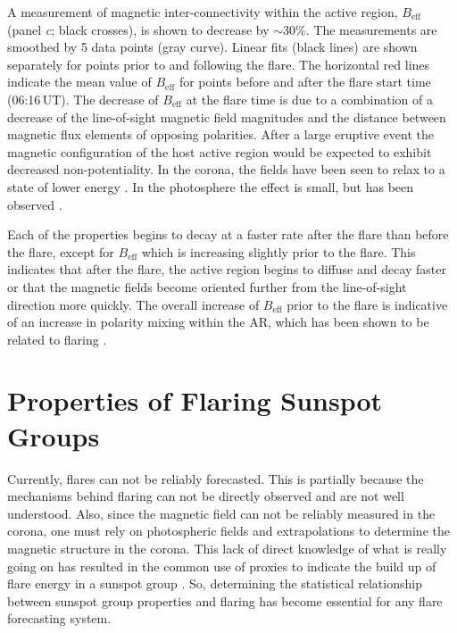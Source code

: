 A measurement of magnetic inter-connectivity within the active region, $B_{\mathrm{eff}}$ (panel \emph{c}; black crosses), is shown to decrease by $\sim$30\%. The measurements are smoothed by 5 data points (gray curve). Linear fits (black lines) are shown separately for points prior to and following the flare. The horizontal red lines indicate the mean value of  $B_{\mathrm{eff}}$ for points before and after the flare start time (06:16\,UT). The decrease of $B_{\mathrm{eff}}$ at the flare time is due to a combination of a decrease of the line-of-sight magnetic field magnitudes and the distance between magnetic flux elements of opposing polarities. After a large eruptive event the magnetic configuration of the host active region would be expected to exhibit decreased non-potentiality. In the corona, the fields have been seen to relax to a state of lower energy  \citep{Conlon:2010b}. In the photosphere the effect is small, but has been observed \citep{Sudol:2005,Murray:2012}. %

Each of the properties begins to decay at a faster rate after the flare than before the flare, except for $B_{\mathrm{eff}}$ which is increasing slightly prior to the flare. This indicates that after the flare, the active region begins to diffuse and decay faster or that the magnetic fields become oriented further from the line-of-sight direction more quickly. The overall increase of $B_{\mathrm{eff}}$ prior to the flare is indicative of an increase in polarity mixing within the \gls{AR}, which has been shown to be related to flaring \citep{Georgoulis:2007}. 

\section{Properties of Flaring Sunspot Groups}\label{sect:statflr}

Currently, flares can not be reliably forecasted. This is partially because the mechanisms behind flaring can not be directly observed and are not well understood. Also, since the magnetic field can not be reliably measured in the corona, one must rely on photospheric fields and extrapolations to determine the magnetic structure in the corona. This lack of direct knowledge of what is really going on has resulted in the common use of proxies to indicate the build up of flare energy in a sunspot group \citep{Schrijver:2007,Falconer:2008}. So, determining the statistical relationship between sunspot group properties and flaring has become essential for any flare forecasting system. 

